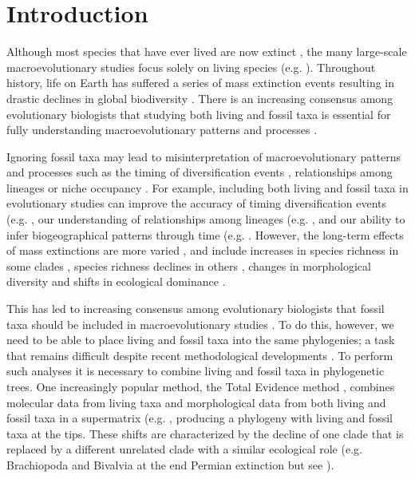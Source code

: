 \chapter{Introduction}
\label{chap:introduction}

Although most species that have ever lived are now extinct \citep{novacek1992ext,raup1993extinction}, the many large-scale macroevolutionary studies focus solely on living species (e.g. \citealp{meredithimpacts2011,jetzthe2012}).
Throughout history, life on Earth has suffered a series of mass extinction events resulting in drastic declines in global biodiversity \citep[e.g.][]{RaupPT,BentonPT,rennetime2013,Brusatte2015}.
There is an increasing consensus among evolutionary biologists that studying both living and fossil taxa is essential for fully understanding macroevolutionary patterns and processes \cite{slaterunifying2013,fritzdiversity2013,Wood01032013}.

Ignoring fossil taxa may lead to misinterpretation of macroevolutionary patterns and processes such as the timing of diversification events \citep[e.g.][]{pyrondivergence2011}, relationships among lineages \citep[e.g.][]{manosphylogeny2007} or niche occupancy \citep[e.g.][]{pearmanniche2008}.
For example, including both living and fossil taxa in evolutionary studies can improve the accuracy of timing diversification events (e.g. \cite{ronquista2012}, our understanding of relationships among lineages (e.g. \cite{beckancient2014}, and our ability to infer biogeographical patterns through time (e.g. \cite{Meseguer01032015}.
However, the long-term effects of mass extinctions are more varied \citep{Erwin1998344}, and include increases in species richness in some clades \citep{friedmanexplosive2010}, species richness declines in others \citep{Benton85}, changes in morphological diversity \citep{Ciampaglio2001,Ciampaglio2004,kornextinction2013} and shifts in ecological dominance \citep[e.g.][]{Brusatte12092008,toljagictriassic-jurassic2013,bensonfaunal2014}.

This has led to increasing consensus among evolutionary biologists that fossil taxa should be included in macroevolutionary studies \citep{jacksonwhat2006,quentaldiversity2010,dietlconservation2011,slaterunifying2013,fritzdiversity2013}.
To do this, however, we need to be able to place living and fossil taxa into the same phylogenies; a task that remains difficult despite recent methodological developments \citep[e.g.][]{pyrondivergence2011,ronquista2012,BEASTmaster}.
To perform such analyses it is necessary to combine living and fossil taxa in phylogenetic trees.
One increasingly popular method, the Total Evidence method \cite{eernissetaxonomic1993,ronquista2012}, combines molecular data from living taxa and morphological data from both living and fossil taxa in a supermatrix (e.g. \cite{pyrondivergence2011,ronquista2012,schragocombining2013,slaterunifying2013,beckancient2014,Meseguer01032015}, producing a phylogeny with living and fossil taxa at the tips. 
These shifts are characterized by the decline of one clade that is replaced by a different unrelated clade with a similar ecological role (e.g. Brachiopoda and Bivalvia at the end Permian extinction \citealt{Sepkiski1981,CLAPHAM01102006} but see \citealt{Payne22052014}). 


